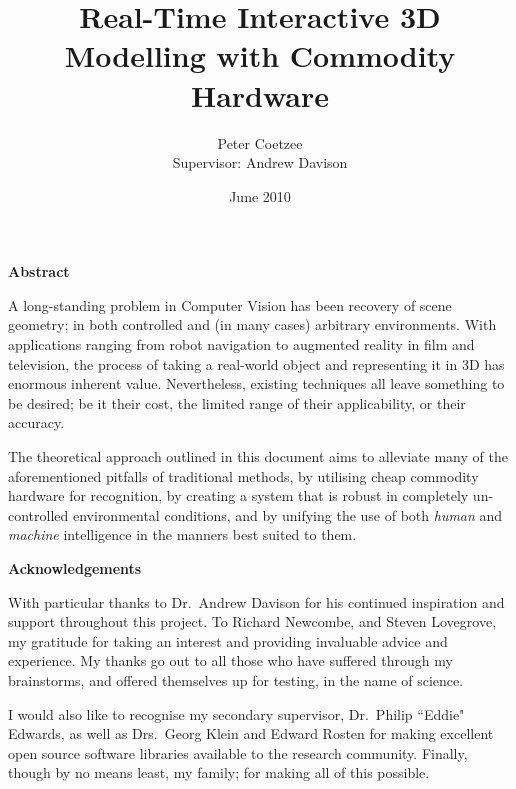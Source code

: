 \documentclass[a4paper,10pt]{report}
\title{Real-Time Interactive 3D Modelling with Commodity Hardware
\vspace{70pt}}
\author{Peter Coetzee\\Supervisor: Andrew Davison
\vspace{70pt}}
\date{June 2010}
\begin{document}
\maketitle

\makeatletter
\newcommand\absname{Abstract}
  \newenvironment{myabstract}{%
      \vspace{50px}%
      \titlepage
      \begin{center}%
        \bfseries \absname
        \@endparpenalty\@M
      \end{center}}
\makeatother

\makeatletter
\newcommand\ackname{Acknowledgements}
  \newenvironment{acknowledgements}{%
      \vspace{70px}%
      \begin{center}%
        \bfseries \ackname
        \@endparpenalty\@M
      \end{center}}
\makeatother

\begin{myabstract}
A long-standing problem in Computer Vision has been recovery of scene geometry; in both controlled and (in many cases) arbitrary environments. With applications ranging from robot navigation to augmented reality in film and television, the process of taking a real-world object and representing it in 3D has enormous inherent value. Nevertheless, existing techniques all leave something to be desired; be it their cost, the limited range of their applicability, or their accuracy.

The theoretical approach outlined in this document aims to alleviate many of the aforementioned pitfalls of traditional methods, by utilising cheap commodity hardware for recognition, by creating a system that is robust in completely un-controlled environmental conditions, and by unifying the use of both \textit{human} and \textit{machine} intelligence in the manners best suited to them.
\end{myabstract}

\begin{acknowledgements}
With particular thanks to Dr.\ Andrew Davison for his continued inspiration and support throughout this project. To Richard Newcombe, and Steven Lovegrove, my gratitude for taking an interest and providing invaluable advice and experience. My thanks go out to all those who have suffered through my brainstorms, and offered themselves up for testing, in the name of science.

 I would also like to recognise my secondary supervisor, Dr.\ Philip ``Eddie" Edwards, as well as Drs.\ Georg Klein and Edward Rosten for making excellent open source software libraries available to the research community. Finally, though by no means least, my family; for making all of this possible.
\end{acknowledgements}
\end{document}
